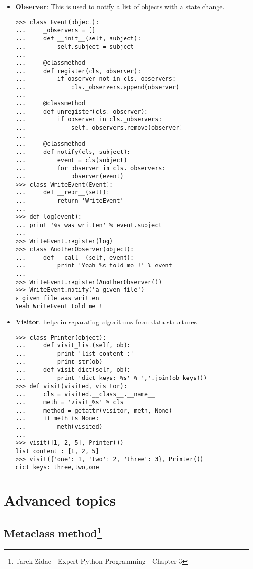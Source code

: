 \documentclass[fleqn,10pt]{SelfArx} %
\begin{document}
\begin{itemize}
	
	\item \textbf{Observer}: This is used to notify a list of objects with a state change.
	
	\begin{lstlisting}
>>> class Event(object):
... 	_observers = []
... 	def __init__(self, subject):
... 		self.subject = subject
...
... 	@classmethod
... 	def register(cls, observer):
... 		if observer not in cls._observers:
... 			cls._observers.append(observer)
...
... 	@classmethod
... 	def unregister(cls, observer):
... 		if observer in cls._observers:
... 			self._observers.remove(observer)
...
... 	@classmethod
... 	def notify(cls, subject):
... 		event = cls(subject)
... 		for observer in cls._observers:
... 			observer(event)
>>> class WriteEvent(Event):
... 	def __repr__(self):
... 		return 'WriteEvent'
... 
>>> def log(event):
... print '%s was written' % event.subject
... 
>>> WriteEvent.register(log)
>>> class AnotherObserver(object):
... 	def __call__(self, event): 
... 		print 'Yeah %s told me !' % event
... 
>>> WriteEvent.register(AnotherObserver())
>>> WriteEvent.notify('a given file')
a given file was written
Yeah WriteEvent told me !
	\end{lstlisting}

	\item \textbf{Visitor}: helps in separating algorithms from data structures
	
	\begin{lstlisting}
>>> class Printer(object):
... 	def visit_list(self, ob):
... 		print 'list content :'
... 		print str(ob)
... 	def visit_dict(self, ob):
... 		print 'dict keys: %s' % ','.join(ob.keys())
>>> def visit(visited, visitor):
... 	cls = visited.__class__.__name__
... 	meth = 'visit_%s' % cls
... 	method = getattr(visitor, meth, None)
... 	if meth is None:
... 		meth(visited)
... 
>>> visit([1, 2, 5], Printer())
list content : [1, 2, 5]
>>> visit({'one': 1, 'two': 2, 'three': 3}, Printer())
dict keys: three,two,one
	\end{lstlisting}

	\end{itemize}

	
	
	\section{Advanced topics}
	
	\subsection[Metaclass method]{Metaclass method\footnote{Tarek Zidae - Expert Python Programming - Chapter 3}}
	
\end{document}
